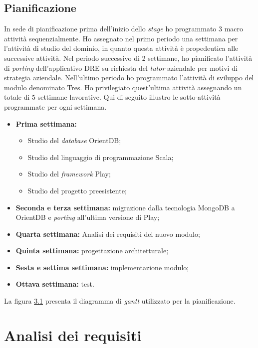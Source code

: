 \subsection{Pianificazione}
In sede di pianificazione prima dell'inizio dello \emph{stage} ho programmato 3 macro attività sequenzialmente. Ho assegnato nel primo periodo una settimana per l'attività di studio del dominio, in quanto questa attività è propedeutica alle successive attività. Nel periodo successivo di 2 settimane, ho pianificato l'attività di \emph{porting} dell'applicativo DRE su richiesta del \emph{tutor} aziendale per motivi di strategia aziendale. Nell'ultimo periodo ho programmato l'attività di sviluppo del modulo denominato Tres. Ho privilegiato quest'ultima attività assegnando un totale di 5 settimane lavorative. Qui di seguito illustro le sotto-attività programmate per ogni settimana. 
\begin{itemize}
\item \textbf{Prima settimana:}
\begin{itemize}
\item Studio del \emph{database} OrientDB;
\item Studio del linguaggio di programmazione Scala;
\item Studio del \emph{framework} Play;
\item Studio del progetto preesistente;
\end{itemize}
\item \textbf{Seconda e terza settimana:} migrazione dalla tecnologia MongoDB a OrientDB e \emph{porting} all’ultima versione di Play;
\item \textbf{Quarta settimana:} Analisi dei requisiti del nuovo modulo;
\item \textbf{Quinta settimana:} progettazione architetturale;
\item \textbf{Sesta e settima settimana:} implementazione modulo;
\item \textbf{Ottava settimana:} test.
\end{itemize}
La figura \hyperref[fig:gantt]{3.1} presenta il diagramma di \emph{gantt} utilizzato per la pianificazione.




\section{Analisi dei requisiti} 

